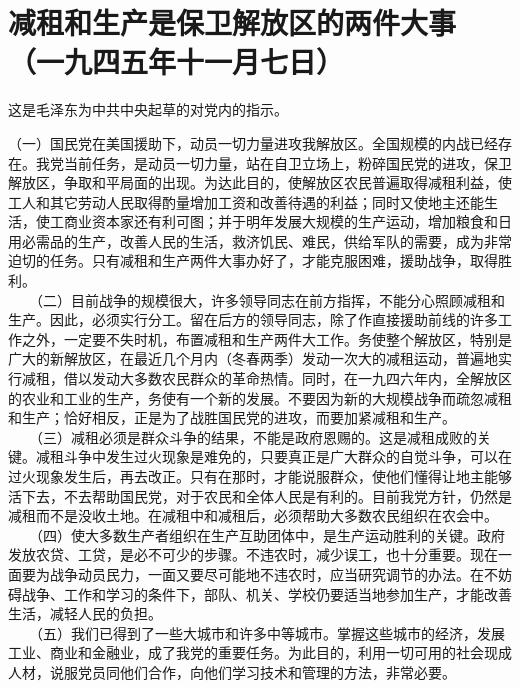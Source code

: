 \documentclass[cn,11pt,chinese]{elegantbook}
\def\myformat#1{\hfil\hfil #1}
\begin{document}
\newpage\section*{\myformat{减租和生产是保卫解放区的两件大事}\\\myformat{（一九四五年十一月七日）}}
\begin{introduction}\item  这是毛泽东为中共中央起草的对党内的指示。\end{introduction}
（一）国民党在美国援助下，动员一切力量进攻我解放区。全国规模的内战已经存在。我党当前任务，是动员一切力量，站在自卫立场上，粉碎国民党的进攻，保卫解放区，争取和平局面的出现。为达此目的，使解放区农民普遍取得减租利益，使工人和其它劳动人民取得酌量增加工资和改善待遇的利益；同时又使地主还能生活，使工商业资本家还有利可图；并于明年发展大规模的生产运动，增加粮食和日用必需品的生产，改善人民的生活，救济饥民、难民，供给军队的需要，成为非常迫切的任务。只有减租和生产两件大事办好了，才能克服困难，援助战争，取得胜利。\\
　　（二）目前战争的规模很大，许多领导同志在前方指挥，不能分心照顾减租和生产。因此，必须实行分工。留在后方的领导同志，除了作直接援助前线的许多工作之外，一定要不失时机，布置减租和生产两件大工作。务使整个解放区，特别是广大的新解放区，在最近几个月内（冬春两季）发动一次大的减租运动，普遍地实行减租，借以发动大多数农民群众的革命热情。同时，在一九四六年内，全解放区的农业和工业的生产，务使有一个新的发展。不要因为新的大规模战争而疏忽减租和生产；恰好相反，正是为了战胜国民党的进攻，而要加紧减租和生产。\\
　　（三）减租必须是群众斗争的结果，不能是政府恩赐的。这是减租成败的关键。减租斗争中发生过火现象是难免的，只要真正是广大群众的自觉斗争，可以在过火现象发生后，再去改正。只有在那时，才能说服群众，使他们懂得让地主能够活下去，不去帮助国民党，对于农民和全体人民是有利的。目前我党方针，仍然是减租而不是没收土地。在减租中和减租后，必须帮助大多数农民组织在农会中。\\
　　（四）使大多数生产者组织在生产互助团体中，是生产运动胜利的关键。政府发放农贷、工贷，是必不可少的步骤。不违农时，减少误工，也十分重要。现在一面要为战争动员民力，一面又要尽可能地不违农时，应当研究调节的办法。在不妨碍战争、工作和学习的条件下，部队、机关、学校仍要适当地参加生产，才能改善生活，减轻人民的负担。\\
　　（五）我们已得到了一些大城市和许多中等城市。掌握这些城市的经济，发展工业、商业和金融业，成了我党的重要任务。为此目的，利用一切可用的社会现成人材，说服党员同他们合作，向他们学习技术和管理的方法，非常必要。\\
\end{document}
